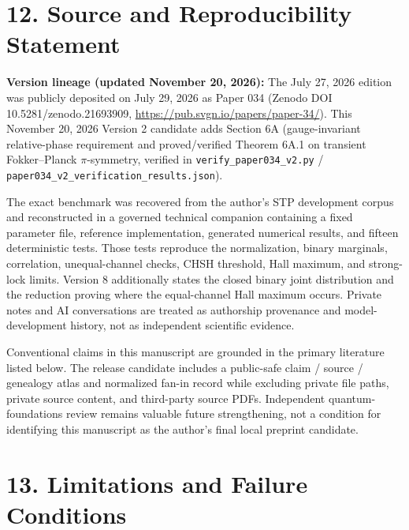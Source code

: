 \documentclass[
  american,
  11pt,
  letterpaper,
]{article}
\begin{document}
\section{12. Source and Reproducibility Statement}\label{source-and-reproducibility-statement}

\textbf{Version lineage (updated November 20, 2026):} The July 27, 2026 edition was publicly deposited on July 29, 2026 as Paper 034 (Zenodo DOI 10.5281/zenodo.21693909, \url{https://pub.svgn.io/papers/paper-34/}). This November 20, 2026 Version 2 candidate adds Section 6A (gauge-invariant relative-phase requirement and proved/verified Theorem 6A.1 on transient Fokker--Planck \(\pi\)-symmetry, verified in \nolinkurl{verify_paper034_v2.py} / \nolinkurl{paper034_v2_verification_results.json}).

The exact benchmark was recovered from the author's STP development corpus and reconstructed in a governed technical companion containing a fixed parameter file, reference implementation, generated numerical results, and fifteen deterministic tests. Those tests reproduce the normalization, binary marginals, correlation, unequal-channel checks, CHSH threshold, Hall maximum, and strong-lock limits. Version 8 additionally states the closed binary joint distribution and the reduction proving where the equal-channel Hall maximum occurs. Private notes and AI conversations are treated as authorship provenance and model-development history, not as independent scientific evidence.

Conventional claims in this manuscript are grounded in the primary literature listed below. The release candidate includes a public-safe claim / source / genealogy atlas and normalized fan-in record while excluding private file paths, private source content, and third-party source PDFs. Independent quantum-foundations review remains valuable future strengthening, not a condition for identifying this manuscript as the author's final local preprint candidate.

\section{13. Limitations and Failure Conditions}\label{limitations-and-failure-conditions}
\end{document}
